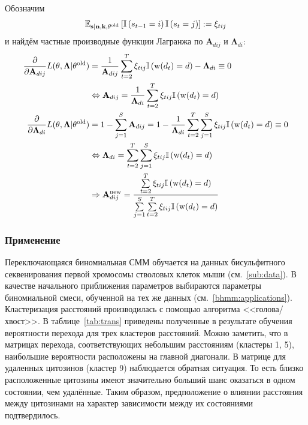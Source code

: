 Обозначим
$$
\mathbb{E}_{\mathbf{s}|\mathbf{n}, \mathbf{k}, \mathbf{\theta}^{\operatorname{old}}} \left[ \mathbb{I}\left( s_{t - 1} = i \right)\mathbb{I}\left( s_t = j \right) \right] := \xi_{tij}
$$
и найдём частные производные функции Лагранжа по $\mathbf{A}_{dij}$ и $\mathbf{\Lambda}_{di}$:
\begin{align*}
  \frac{\partial}{\partial \mathbf{A}_{dij}}
  L(\mathbf{\theta}, \mathbf{\Lambda}|\mathbf{\theta}^{\operatorname{old}})
  &= \frac{1}{\mathbf{A}_{dij}} \sum\limits_{t = 2}^T
     \xi_{tij}\mathbb{I}\left( \operatorname{w}(d_t) = d \right) - \mathbf{\Lambda}_{di} \equiv 0 \\
  &\Leftrightarrow \mathbf{A}_{dij}
   = \frac{1}{\mathbf{\Lambda}_{di}} \sum\limits_{t = 2}^T
     \xi_{tij} \mathbb{I}\left( \operatorname{w}(d_t) = d \right) \\
  \frac{\partial}{\partial \mathbf{\Lambda}_{di}}
  L(\mathbf{\theta}, \mathbf{\Lambda}|\mathbf{\theta}^{\operatorname{old}})
  &= 1 - \sum\limits_{j = 1}^S \mathbf{A}_{dij}
   = 1 -
     \frac{1}{\mathbf{\Lambda}_{di}} \sum\limits_{t = 2}^T
     \sum\limits_{j = 1}^S \xi_{tij} \mathbb{I}\left( \operatorname{w}(d_t) = d \right) \equiv 0 \\
  &\Leftrightarrow \mathbf{\Lambda}_{di}
  = \sum\limits_{t = 2}^T
    \sum\limits_{j = 1}^S \xi_{tij} \mathbb{I}\left( \operatorname{w}(d_t) = d \right) \\
  &\Rightarrow \mathbf{A}_{dij}^{\operatorname{new}}
  = \frac{\sum\limits_{t = 2}^T \xi_{tij} \mathbb{I}\left( \operatorname{w}(d_t) = d \right)}
         {\sum\limits_{j = 1}^S
          \sum\limits_{t = 2}^T \xi_{tij} \mathbb{I}\left( \operatorname{w}(d_t) = d \right)}
\end{align*}

\subsubsection{Применение}

Переключающаяся биномиальная СММ обучается на данных бисульфитного секвенирования
первой хромосомы стволовых клеток мыши (см.~\ref{sub:data}). В качестве начального
приближения параметров выбираются параметры биномиальной смеси, обученной на тех же
данных (см.~\ref{bhmm:applications}). Кластеризация расстояний производилась с
помощью алгоритма <<голова/хвост>>. В таблице~\ref{tab:trans} приведены полученные в
результате обучения вероятности перехода для трех кластеров расстояний. Можно заметить,
что в матрицах перехода, соответствующих небольшим расстояниям (кластеры 1, 5),
наибольшие вероятности расположены на главной диагонали. В матрице для удаленных
цитозинов (кластер 9) наблюдается обратная ситуация. То есть близко расположенные
цитозины имеют значительно больший шанс оказаться в одном состоянии, чем удалённые.
Таким образом, предположение о влиянии расстояния между цитозинами на характер зависимости
между их состояниями подтвердилось.

